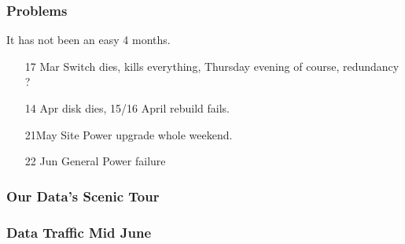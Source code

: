 \documentclass{beamer}
\begin{document}
\begin{frame}
\frametitle{Problems}
It has not been an easy 4 months.
\begin{itemize}
  \item [17 Mar] Switch dies, kills everything, Thursday evening of course, redundancy ?
  \item [14 Apr] disk dies, 15/16 April rebuild fails.
  \item [21May] Site Power upgrade whole weekend.
  \item [22 Jun] General Power failure
\end{itemize}
\end{frame}
\begin{frame}
  \frametitle{Our Data's Scenic Tour}
\end{frame}
\begin{frame}
  \frametitle{Data Traffic Mid June}
\end{frame}
\end{document}
